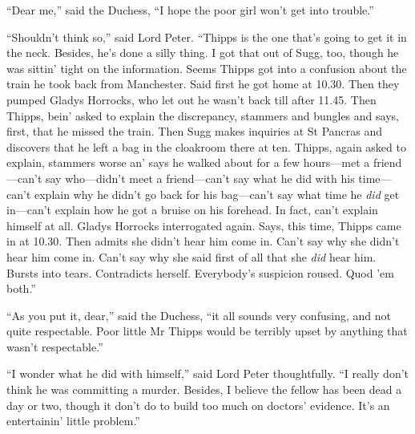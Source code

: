 \enquote{Dear me,} said the Duchess, \enquote{I hope the poor girl won’t get into trouble.}

\enquote{Shouldn’t think so,} said Lord Peter. \enquote{Thipps is the one that’s going to get it in the neck. Besides, he’s done a silly thing. I got that out of Sugg, too, though he was sittin’ tight on the information. Seems Thipps got into a confusion about the train he took back from Manchester. Said first he got home at 10.30. Then they pumped Gladys Horrocks, who let out he wasn’t back till after 11.45. Then Thipps, bein’ asked to explain the discrepancy, stammers and bungles and says, first, that he missed the train. Then Sugg makes inquiries at St Pancras and discovers that he left a bag in the cloakroom there at ten. Thipps, again asked to explain, stammers worse an’ says he walked about for a few hours\allowbreak---\allowbreak met a friend\allowbreak---\allowbreak can’t say who\allowbreak---\allowbreak didn’t meet a friend\allowbreak---\allowbreak can’t say what he did with his time\allowbreak---\allowbreak can’t explain why he didn’t go back for his bag\allowbreak---\allowbreak can’t say what time he \textit{did} get in\allowbreak---\allowbreak can’t explain how he got a bruise on his forehead. In fact, can’t explain himself at all. Gladys Horrocks interrogated again. Says, this time, Thipps came in at 10.30. Then admits she didn’t hear him come in. Can’t say why she didn’t hear him come in. Can’t say why she said first of all that she \textit{did} hear him. Bursts into tears. Contradicts herself. Everybody’s suspicion roused. Quod ’em both.}

\enquote{As you put it, dear,} said the Duchess, \enquote{it all sounds very confusing, and not quite respectable. Poor little Mr Thipps would be terribly upset by anything that wasn’t respectable.}

\enquote{I wonder what he did with himself,} said Lord Peter thoughtfully. \enquote{I really don’t think he was committing a murder. Besides, I believe the fellow has been dead a day or two, though it don’t do to build too much on doctors’ evidence. It’s an entertainin’ little problem.}

